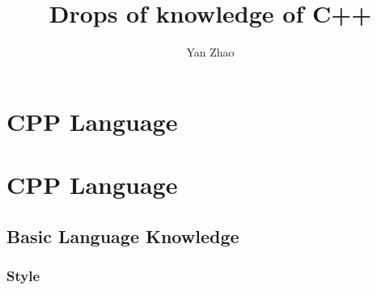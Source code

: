 \documentclass[a4paper,12pt,twoside]{book}
\begin{document}
\title{Drops of knowledge of C++}
\author{Yan Zhao}
\date{}\maketitle

\setcounter{secnumdepth}{4}
\setcounter{tocdepth}{4}
\tableofcontents
\chapter{CPP Language}

\else
\chapter{CPP Language}
\fi


\section{Basic Language Knowledge}
\subsection{Style}
\end{document}
